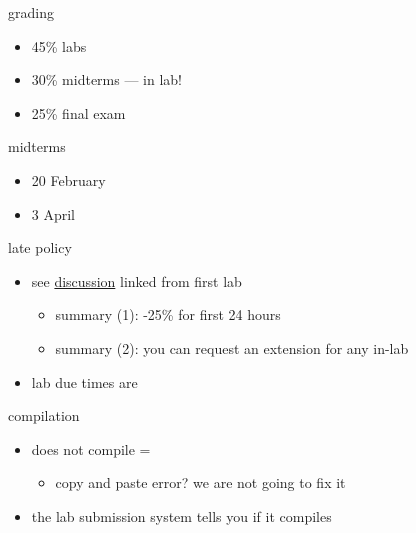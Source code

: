 \begin{frame}{grading}
    \begin{itemize}
    \item 45\% labs
    \item 30\% midterms --- in lab!
    \item 25\% final exam
    \end{itemize}
\end{frame}

\begin{frame}{midterms}
    \begin{itemize}
    \item 20 February
    \item 3 April
    \end{itemize}
\end{frame}

\begin{frame}{late policy}
    \begin{itemize}
    \item see \href{https://markfloryan.github.io/pdr/uva/labduedates.html}{discussion} linked from first lab
        \begin{itemize}
            \item summary (1): -25\% for first 24 hours
            \item summary (2): you can request an extension for any in-lab
        \end{itemize}
        \vspace{.5cm}
    \item lab due times are 
    \end{itemize}
\end{frame}

\begin{frame}{compilation}
    \begin{itemize}
    \item does not compile = 
        \begin{itemize}
        \item copy and paste error? we are not going to fix it
        \end{itemize}
    \vspace{.5cm}
    \item the lab submission system tells you if it compiles
    \end{itemize}
\end{frame}


